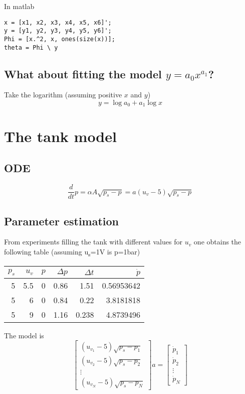 \documentclass[a4paper]{scrartcl}
\begin{document}
In matlab
\begin{verbatim}
x = [x1, x2, x3, x4, x5, x6]';
y = [y1, y2, y3, y4, y5, y6]';
Phi = [x.^2, x, ones(size(x))];
theta = Phi \ y
\end{verbatim}

\subsection{What about fitting the model \(y = a_0 x^{a_1}\)?}
\label{sec:orgf11b322}
Take the logarithm (assuming positive \(x\) and \(y\))
\[ y = \log a_0 + a_1\log x\]

\section{The tank model}
\label{sec:org01022a6}

\subsection{ODE}
\label{sec:orga07be0b}

\[\frac{d}{dt} p = \alpha A \sqrt{p_s - p} = a (u_v - 5) \sqrt{p_s - p}\]

\subsection{Parameter estimation}
\label{sec:org275496d}
From experiments filling the tank with different values for \(u_v\) one obtains the following table (assuming u\textsubscript{s}=1V is p=1bar)
\begin{center}
\begin{tabular}{rrrrrr}
\(p_s\) & \(u_v\) & \(p\) & \(\Delta p\) & \(\Delta t\) & \(\dot{p}\)\\
\hline
5 & 5.5 & 0 & 0.86 & 1.51 & 0.56953642\\
5 & 6 & 0 & 0.84 & 0.22 & 3.8181818\\
5 & 9 & 0 & 1.16 & 0.238 & 4.8739496\\
\end{tabular}
\end{center}

The model is 
\[ \begin{bmatrix} (u_{v_1} - 5)\sqrt{p_s - p_1} \\
                      (u_{v_2} - 5)\sqrt{p_s - p_2} \\
		      \vdots\\
		      (u_{v_N} - 5)\sqrt{p_s - p_N} \end{bmatrix} a = \begin{bmatrix} \dot{p}_1\\ \dot{p}_2\\\vdots\\ \dot{p}_N\end{bmatrix}
\]
\end{document}
